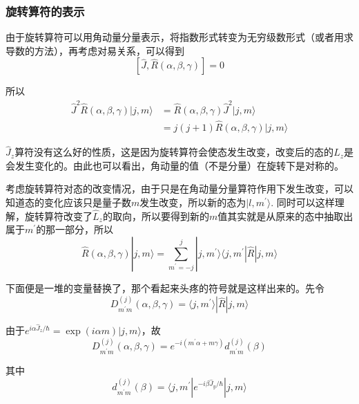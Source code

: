 \documentclass[UTF8]{ctexart}
\begin{document}
    \subsubsection{旋转算符的表示}
    由于旋转算符可以用角动量分量表示，将指数形式转变为无穷级数形式（或者用求导数的方法），再考虑对易关系，可以得到
    \begin{equation}
        \left[\hat{J},\hat{R}(\alpha,\beta,\gamma)\right] = 0
    \end{equation}

\noindent 所以 
\begin{equation}
    \begin{aligned}
        \hat{J}^2 \hat{R}(\alpha,\beta,\gamma)|j,m \rangle &= \hat{R}(\alpha,\beta,\gamma)\hat{J}^2|j,m \rangle \\
        &=j(j+1) \hat{R}(\alpha,\beta,\gamma)|j,m \rangle
    \end{aligned}
\end{equation}

\noindent $\hat{J}_z$算符没有这么好的性质，这是因为旋转算符会使态发生改变，改变后的态的$L_z$是会发生变化的。由此也可以看出，角动量的值（不是分量）在旋转下是对称的。

    考虑旋转算符对态的改变情况，由于只是在角动量分量算符作用下发生改变，可以知道态的变化应该只是量子数$m$发生改变，所以新的态为$| l ,m^{\prime} \rangle$. 同时可以这样理解，旋转算符改变了$\hat{L}_z$的取向，所以要得到新的$m$值其实就是从原来的态中抽取出属于$m^{\prime}$的那一部分，所以
    \begin{equation}
        \hat{R}(\alpha,\beta,\gamma)| j,m \rangle = \sum^{j}_{m^{\prime}=-j} |j,m^{\prime} \rangle \langle j , m^{\prime}|\hat{R} | j,m \rangle
    \end{equation}

\noindent 下面便是一堆的变量替换了，那个看起来头疼的符号就是这样出来的。先令
\begin{equation}
    D^{(j)}_{m^{\prime}m}(\alpha,\beta,\gamma) = \langle j , m ^{\prime} \rangle| \hat{R} | j ,m \rangle
\end{equation}

\noindent 由于$e^{i\alpha \hat{J}_z/\hbar} = \exp(i\alpha m) | j,m \rangle$，故
\begin{equation}
    D^{(j)}_{m^{\prime}m}(\alpha,\beta,\gamma) = e^{-i(m^{\prime}\alpha + m \gamma)} d^{(j)}_{m^{\prime}m}(\beta)
\end{equation}

\noindent 其中 
\begin{equation}
    d^{(j)}_{m^{\prime}m}(\beta) = \langle j, m^{\prime} | e^{-i\beta \hat{J}_y/\hbar} |j,m \rangle \label{equ5.5}
\end{equation}
\end{document}
